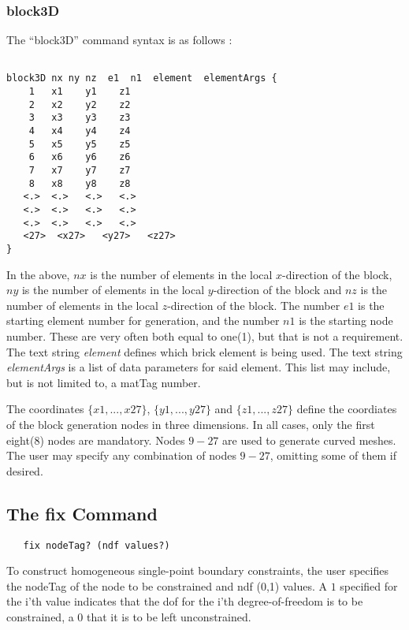 \documentclass[12pt]{article}
\begin{document}
\subsubsection{block3D}
The ``block3D'' command syntax is as follows :
{\sf\small
\begin{verbatim}

block3D nx ny nz  e1  n1  element  elementArgs {
    1   x1    y1    z1 
    2   x2    y2    z2 
    3   x3    y3    z3 
    4   x4    y4    z4 
    5   x5    y5    z5 
    6   x6    y6    z6 
    7   x7    y7    z7 
    8   x8    y8    z8 
   <.>  <.>   <.>   <.>   
   <.>  <.>   <.>   <.>
   <.>  <.>   <.>   <.>
   <27>  <x27>   <y27>   <z27>
}
\end{verbatim}

}
In the above, $nx$ is the number of elements in the local $x$-direction of
the block,
$ny$ is the number of elements in the local $y$-direction of
the block and
$nz$ is the number of elements in the local $z$-direction of
the block.
The number $e1$ is the starting element number for generation, and 
the number $n1$ is the starting node number.  These are very often both equal to 
one(1), but that is not a requirement.  The text string {\em element} defines 
which brick element is being used.  The text string {\em elementArgs}
is a list of data parameters for said element.  This list may include, but is
not limited to, a matTag number.

The coordinates $\{x1,...,x27\}$, $\{y1,...,y27\}$ and $\{z1,...,z27\}$
define the coordiates
of the block generation nodes in three dimensions.  
In all cases, only the first eight(8) 
nodes are mandatory. Nodes $9-27$ are used to generate curved meshes.
The user may specify any combination of nodes $9-27$, omitting some of them
if desired.




\subsection{The fix Command}
{\sf\small
\begin{verbatim}
   fix nodeTag? (ndf values?)
\end{verbatim}
}

To construct homogeneous single-point boundary constraints, the user
specifies the nodeTag of the node to be constrained and ndf (0,1)
values. A $1$ specified for the i'th value indicates that the dof for
the i'th degree-of-freedom is to be constrained, a $0$ that it is to be
left unconstrained.
\end{document}
